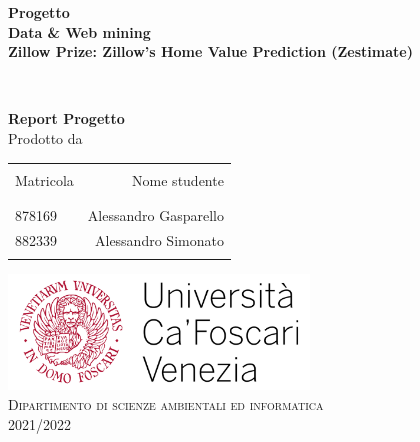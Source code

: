 \begin{titlepage}

\begin{center}

\textup{\small {\bf Progetto \\ Data \& Web mining} }\\[0.2in]

\Large \textbf {Zillow Prize: Zillow’s Home Value Prediction (Zestimate)}\\[0.5in]

\end{center}
~
\begin{center}

\textup{\small {\bf Report Progetto}}\\[0.2in]
              
\normalsize Prodotto da \\
\begin{table}[h]
\centering
\begin{tabular}{lr}\hline \\
Matricola & Nome studente \\ \\ \hline
\\
878169 & Alessandro Gasparello \\
882339 & Alessandro Simonato \\ \\ \hline 
\end{tabular}
\end{table}
              
\vspace{1.9in}
            
\includegraphics[width=0.60\textwidth]{./unive.png}\\[0.3in]
\normalsize
\textsc{Dipartimento di scienze ambientali ed informatica}\\
\vspace{0.2cm}
       2021/2022
              
\end{center}
              
\end{titlepage}
              
